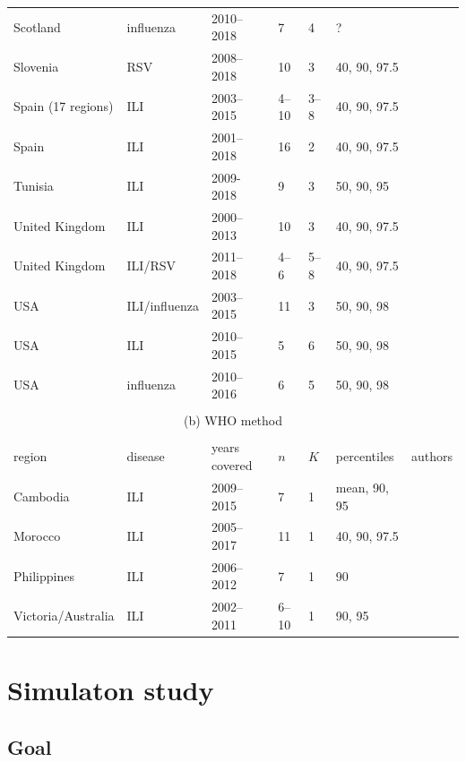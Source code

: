 \documentclass{article}
\begin{document}
\begin{table}
\begin{tabular}{l l l l l l l}
Scotland & influenza & 2010--2018 & 7 & 4 & ? & \cite{Murray2018}\\
Slovenia & RSV & 2008--2018 & 10 & 3 & 40, 90, 97.5 & \cite{Grilc2020}\\
Spain (17 regions) & ILI & 2003--2015 & 4--10 & 3--8 & 40, 90, 97.5 & \cite{Bangert2017}\\
Spain & ILI & 2001--2018 & 16 & 2 & 40, 90, 97.5 & \cite{RedondoBravo2020}\\
Tunisia & ILI & 2009-2018 & 9 & 3 & 50, 90, 95 & \cite{Bouguerra2020}\\
United Kingdom & ILI & 2000--2013 & 10 & 3 & 40, 90, 97.5 & \cite{Green2015}\\
United Kingdom & ILI/RSV & 2011--2018 & 4--6 & 5--8 & 40, 90, 97.5 & \cite{Harcourt2019}\\
USA & ILI/influenza & 2003--2015 & 11 & 3 & 50, 90, 98 & \cite{Biggerstaff2017}\\
USA & ILI & 2010--2015 & 5 & 6 & 50, 90, 98 & \cite{Dahlgren2018}\\
USA & influenza & 2010--2016 & 6 & 5 & 50, 90, 98 & \cite{Dahlgren2019}\\
\bottomrule\\
\multicolumn{7}{c}{(b) WHO method}\\ \\
\toprule
region & disease & years covered & $n$ & $K$ & percentiles & authors\\
\midrule
Cambodia & ILI & 2009--2015 & 7 & 1 & mean, 90, 95 & \cite{Ly2017}\\
Morocco & ILI & 2005--2017 & 11 & 1 & 40, 90, 97.5 & \cite{Rguig2020}\\
Philippines & ILI & 2006--2012 & 7 & 1 & 90 & \cite{Lucero2016}\\
Victoria/Australia & ILI & 2002--2011 & 6--10 & 1 & 90, 95 & \cite{Tay2013}\\
\end{tabular}
\end{table}




\section{Simulaton study}
\label{sec:simulation}

\subsection{Goal}
\end{document}
